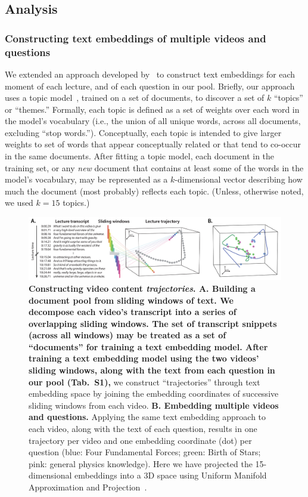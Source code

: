 \documentclass[10pt]{article}
\newcommand{\questions}{S1}
\begin{document}
\subsection*{Analysis}

\subsubsection*{Constructing text embeddings of multiple videos and questions}

We extended an approach developed by~\citep{HeusEtal21} to construct text
embeddings for each moment of each lecture, and of each question in our pool.
Briefly, our approach uses a topic model~\citep{BleiEtal03}, trained on a set
of documents, to discover a set of $k$ ``topics'' or ``themes.'' Formally, each
topic is defined as a set of weights over each word in the model's vocabulary
(i.e., the union of all unique words, across all documents, excluding ``stop
words.''). Conceptually, each topic is intended to give larger weights to set
of words that appear conceptually related or that tend to co-occur in the same
documents. After fitting a topic model, each document in the training set, or
any \textit{new} document that contains at least some of the words in the
model's vocabulary, may be represented as a $k$-dimensional vector describing
how much the document (most probably) reflects each topic. (Unless, otherwise
noted, we used $k = 15$ topics.)

\begin{figure}[tp]
\centering
\includegraphics[width=\textwidth]{figs/sliding_windows}

\caption{\textbf{Constructing video content \textit{trajectories}. \textbf{A.
Building a document pool from sliding windows of text.} We decompose each
video's transcript into a series of overlapping sliding windows. The set of
transcript snippets (across all windows) may be treated as a set of
``documents'' for training a text embedding model. After training a text
embedding model using the two videos' sliding windows, along with the text from
each question in our pool (Tab.~\questions), } we construct ``trajectories''
through text embedding space by joining the embedding coordinates of successive
sliding windows from each video. \textbf{B. Embedding multiple videos and
questions.} Applying the same text embedding approach to each video, along with
the text of each question, results in one trajectory per video and one
embedding coordinate (dot) per question (blue: Four Fundamental Forces; green:
Birth of Stars; pink: general physics knowledge). Here we have projected the
15-dimensional embeddings into a 3D space using Uniform Manifold Approximation
and Projection~\citep[UMAP;][]{McInEtal18a}.}

\label{fig:sliding-windows}
\end{figure}
\end{document}
